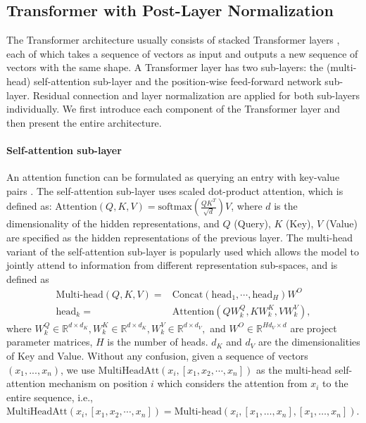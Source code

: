 \documentclass{article}
\begin{document}
\subsection{Transformer  with Post-Layer Normalization}
The Transformer architecture usually consists of stacked Transformer layers \citep{vaswani2017attention,devlin2018bert}, each of which takes a sequence of vectors as input and outputs a new sequence of vectors with the same shape. A Transformer layer has two sub-layers: the (multi-head) self-attention sub-layer and the position-wise feed-forward network sub-layer. Residual connection \citep{he2016deep} and layer normalization \citep{lei2016layer} are applied for both sub-layers individually. We first introduce each component of the Transformer layer and then present the entire architecture.

\paragraph{Self-attention sub-layer}
An attention function can be formulated as querying an entry with key-value pairs \citep{vaswani2017attention}. The self-attention sub-layer uses scaled dot-product attention, which is defined as: $\text{Attention}(Q,K,V)=\text{softmax}(\frac{QK^T}{\sqrt{d}})V$, where $d$ is the dimensionality of the hidden representations, and $Q$ (Query), $K$ (Key), $V$ (Value) are specified as the hidden representations of the previous layer. The multi-head variant of the self-attention sub-layer is popularly used which allows the model to jointly attend to information from different representation sub-spaces, and is defined as
\begin{align}
\text{Multi-head}(Q,K,V) ={}& \text{Concat} (\text{head}_1,\cdots,\text{head}_H)W^O \nonumber\\
\text{head}_k ={}& \text{Attention}(QW_k^Q, KW_k^K,VW_k^V), \nonumber
\end{align}
where $W_k^Q\in \mathbb{R}^{d \times d_K}, W_k^K\in \mathbb{R}^{d \times d_K}, W_k^V\in \mathbb{R}^{d\times d_V},$ and $W^O\in \mathbb{R}^{Hd_V \times d}$ are project parameter matrices, $H$ is the number of heads. $d_K$ and $d_V$ are the dimensionalities of Key and Value. Without any confusion, given a sequence of vectors $(x_1,...,x_n)$, we use $\text{MultiHeadAtt}(x_{i},[ x_{ 1}, x_{2},\cdots, x_{n}])$ as the multi-head self-attention mechanism on position $i$ which considers the attention from $x_i$ to the entire sequence, i.e., $\text{MultiHeadAtt}(x_{i},[ x_{ 1}, x_{2},\cdots, x_{n}])=\text{Multi-head}(x_i, [x_1, \dots, x_n], [x_1, \dots, x_n])$.
\end{document}
